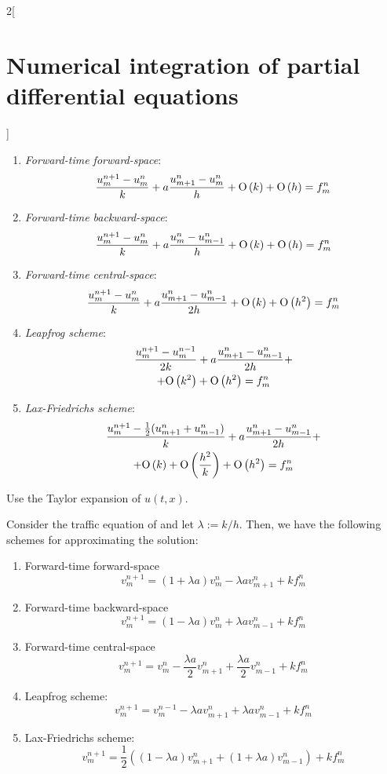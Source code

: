 \documentclass[../../../main_math.tex]{subfiles}
\begin{document}
\begin{multicols}{2}[\section{Numerical integration of partial differential equations}]
\begin{proposition}
\begin{enumerate}
      \item \emph{Forward-time forward-space}:
            $$\frac{u_m^{n+1}-u_m^n}{k}+a\frac{u_{m+1}^n-u_m^n}{h}+\mathrm{O}\left(k\right)+\mathrm{O}\left(h\right)=f_m^n$$
      \item \emph{Forward-time backward-space}:
            $$\frac{u_m^{n+1}-u_m^n}{k}+a\frac{u_{m}^n-u_{m-1}^n}{h}+\mathrm{O}\left(k\right)+\mathrm{O}\left(h\right)=f_m^n$$
      \item \emph{Forward-time central-space}:
            $$\frac{u_m^{n+1}-u_m^n}{k}+a\frac{u_{m+1}^n-u_{m-1}^n}{2h}+\mathrm{O}\left(k\right)+\mathrm{O}\left(h^2\right)=f_m^n$$
      \item \emph{Leapfrog scheme}:
            \begin{multline*}
              \frac{u_m^{n+1}-u_m^{n-1}}{2k}+a\frac{u_{m+1}^n-u_{m-1}^n}{2h}+\\+\mathrm{O}\left(k^2\right)+\mathrm{O}\left(h^2\right)=f_m^n
            \end{multline*}
      \item \emph{Lax-Friedrichs scheme}:
            \begin{multline*}
              \frac{u_m^{n+1}-\frac{1}{2}(u_{m+1}^n+u_{m-1}^n)}{k}+a\frac{u_{m+1}^n-u_{m-1}^n}{2h} + \\ + \mathrm{O}\left(k\right)+\mathrm{O}\left(\frac{h^2}{k}\right)+\mathrm{O}\left(h^2\right)=f_m^n
            \end{multline*}
    \end{enumerate}
  \end{proposition}
  \begin{sproof}
    Use the Taylor expansion of $u(t,x)$.
  \end{sproof}
  \begin{corollary}
    Consider the traffic equation of  and let $\lambda:=k/h$. Then, we have the following schemes for approximating the solution:
    \begin{enumerate}
      \item Forward-time forward-space
            $$\displaystyle v_m^{n+1}=(1+\lambda a)v_m^n-\lambda av_{m+1}^n+kf_m^n$$
      \item Forward-time backward-space
            $$\displaystyle v_m^{n+1}=(1-\lambda a)v_m^n+\lambda av_{m-1}^n+kf_m^n$$
      \item Forward-time central-space
            $$\displaystyle v_m^{n+1}=v_m^n-\frac{\lambda a}{2}v_{m+1}^n+\frac{\lambda a}{2}v_{m-1}^n+kf_m^n$$
      \item Leapfrog scheme: $$v_m^{n+1}=v_m^{n-1}-\lambda av_{m+1}^n+\lambda av_{m-1}^n+kf_m^n$$
      \item Lax-Friedrichs scheme: $$v_m^{n+1}=\frac{1}{2}\left((1-\lambda a)v_{m+1}^n+(1+\lambda a)v_{m-1}^n\right)+kf_m^n$$
    \end{enumerate}
  \end{corollary}

\end{multicols}
\end{document}
